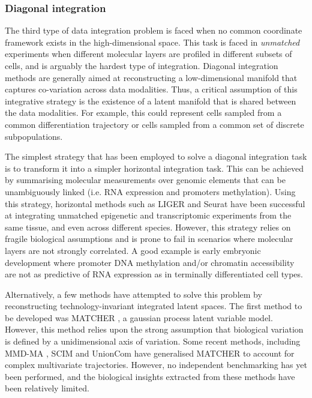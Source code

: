 \subsubsection{Diagonal integration}

The third type of data integration problem is faced when no common coordinate framework exists in the high-dimensional space. This task is faced in \textit{unmatched} experiments when different molecular layers are profiled in different subsets of cells, and is arguably the hardest type of integration. Diagonal integration methods are generally aimed at reconstructing a low-dimensional manifold that captures co-variation across data modalities. Thus, a critical assumption of this integrative strategy is the existence of a latent manifold that is shared between the data modalities. For example, this could represent cells sampled from a common differentiation trajectory or cells sampled from a common set of discrete subpopulations.

The simplest strategy that has been employed to solve a diagonal integration task is to transform it into a simpler horizontal integration task. This can be achieved by summarising molecular measurements over genomic elements that can be unambiguously linked (i.e. RNA expression and promoters methylation). Using this strategy, horizontal methods such as LIGER \cite{Welch2019} and Seurat \cite{Stuart2019b} have been successful at integrating unmatched epigenetic and transcriptomic experiments from the same tissue, and even across different species. However, this strategy relies on fragile biological assumptions and is prone to fail in scenarios where molecular layers are not strongly correlated. A good example is early embryonic development where promoter DNA methylation and/or chromatin accessibility are not as predictive of RNA expression \cite{Argelaguet2019} as in terminally differentiated cell types. 

Alternatively, a few methods have attempted to solve this problem by reconstructing technology-invariant integrated latent spaces. The first method to be developed was MATCHER \cite{Welch2017}, a gaussian process latent variable model. However, this method relies upon the strong assumption that biological variation is defined by a unidimensional axis of variation. Some recent methods, including MMD-MA \cite{Liu2019a}, SCIM \cite{Stark2020} and UnionCom \cite{Cao2020} have generalised MATCHER to account for complex multivariate trajectories. However, no independent benchmarking has yet been performed, and the biological insights extracted from these methods have been relatively limited. 


